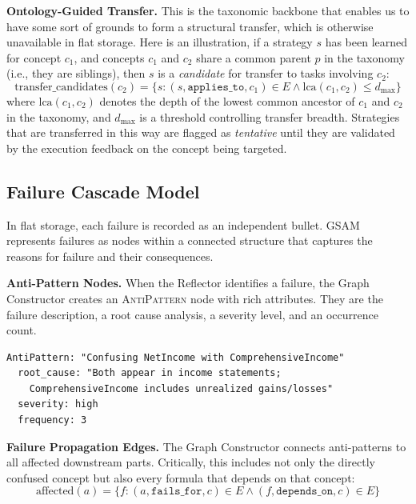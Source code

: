 \documentclass[12pt,a4paper,oneside]{article}
\begin{document}
\textbf{Ontology-Guided Transfer.} This is the taxonomic backbone that enables us to have some sort of grounds to form a structural transfer, which is otherwise unavailable in flat storage. Here is an illustration, if a strategy $s$ has been learned for concept $c_1$, and concepts $c_1$ and $c_2$ share a common parent $p$ in the taxonomy (i.e., they are siblings), then $s$ is a \textit{candidate} for transfer to tasks involving $c_2$:
\begin{equation}
\text{transfer\_candidates}(c_2) = \{s : (s, \texttt{applies\_to}, c_1) \in E \land \text{lca}(c_1, c_2) \leq d_{\max}\}
\label{eq:transfer}
\end{equation}
where $\text{lca}(c_1, c_2)$ denotes the depth of the lowest common ancestor of $c_1$ and $c_2$ in the taxonomy, and $d_{\max}$ is a threshold controlling transfer breadth. Strategies that are transferred in this way are flagged as \textit{tentative} until they are validated by the execution feedback on the concept being targeted.

\subsection{Failure Cascade Model}
\label{sec:failure}

In flat storage, each failure is recorded as an independent bullet. GSAM represents failures as nodes within a connected structure that captures the reasons for failure and their consequences.

\textbf{Anti-Pattern Nodes.} When the Reflector identifies a failure, the Graph Constructor creates an \textsc{AntiPattern} node with rich attributes. They are the failure description, a root cause analysis, a severity level, and an occurrence count.

\begin{lstlisting}[caption={Example AntiPattern node attributes.},label={lst:antipattern}]
AntiPattern: "Confusing NetIncome with ComprehensiveIncome"
  root_cause: "Both appear in income statements;
    ComprehensiveIncome includes unrealized gains/losses"
  severity: high
  frequency: 3
\end{lstlisting}

\textbf{Failure Propagation Edges.} The Graph Constructor connects anti-patterns to all affected downstream parts. Critically, this includes not only the directly confused concept but also every formula that depends on that concept:
\begin{equation}
\text{affected}(a) = \{f : (a, \texttt{fails\_for}, c) \in E \land (f, \texttt{depends\_on}, c) \in E\}
\end{equation}
\end{document}
